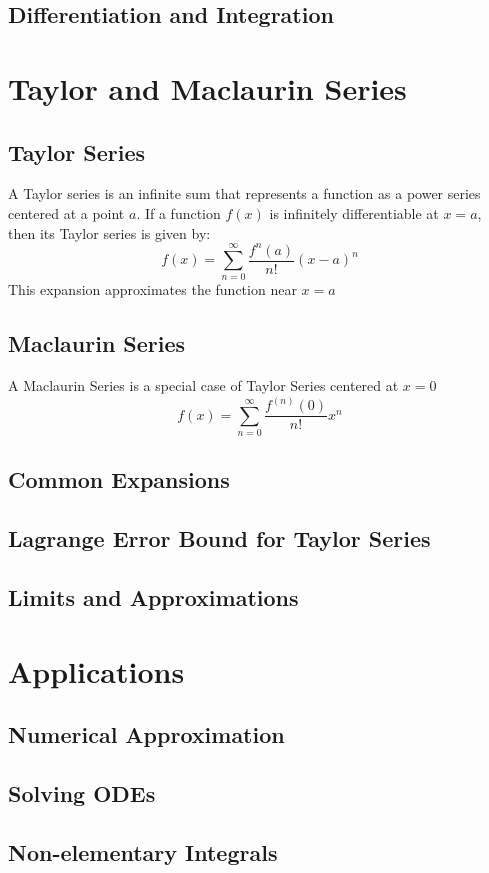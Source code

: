 \documentclass[11pt]{article}
\begin{document}
\subsection{Differentiation and Integration}
\section{Taylor and Maclaurin Series}
\subsection{Taylor Series}
A Taylor series is an infinite sum that represents a function as a power series centered at a point $a$. If a function $f(x)$ is infinitely differentiable at $x = a$, then its Taylor series is given by:
\[
  f(x)=\sum_{n=0}^\infty\frac{f^n(a)}{n!}(x-a)^n
\]
This expansion approximates the function near $x=a$
\subsection{Maclaurin Series}
A Maclaurin Series is a special case of Taylor Series centered at $x=0$
\[
  f(x) = \sum_{n=0}^{\infty} \frac{f^{(n)}(0)}{n!} x^n
\]
\subsection{Common Expansions}

\subsection{Lagrange Error Bound for Taylor Series}
\subsection{Limits and Approximations}
\section{Applications}
\subsection{Numerical Approximation}
\subsection{Solving ODEs}
\subsection{Non-elementary Integrals}
\end{document}

